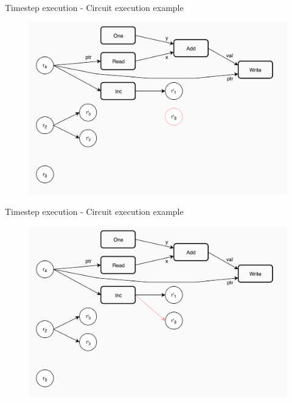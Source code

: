 \documentclass[xcolor={usenames}]{beamer}
\begin{document}
  \begin{frame}{Timestep execution - Circuit execution example}
  	\begin{figure}
  		\centering
  		\includegraphics[width=\textwidth]{../figures/example-circuit-18.png}
  	\end{figure}
  \end{frame}
  \begin{frame}{Timestep execution - Circuit execution example}
  	\begin{figure}
  		\centering
  		\includegraphics[width=\textwidth]{../figures/example-circuit-19.png}
  	\end{figure}
  \end{frame}
\end{document}
